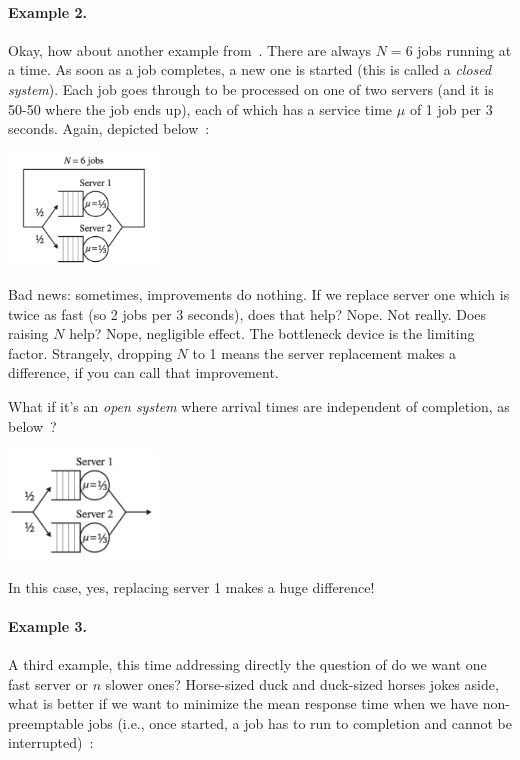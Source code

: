 \paragraph{Example 2.} Okay, how about another example from~\cite{pmd}. There are always $N=6$ jobs running at a time. As soon as a job completes, a new one is started (this is called a \textit{closed system}). Each job goes through to be processed on one of two servers (and it is 50-50 where the job ends up), each of which has a service time $\mu$ of 1 job per 3 seconds. Again, depicted below~\cite{pmd}:


\begin{center}
	\includegraphics[width=0.3\textwidth]{images/qt-example2.png}
\end{center}

Bad news: sometimes, improvements do nothing. If we replace server one which is twice as fast (so 2 jobs per 3 seconds), does that help? Nope. Not really. Does raising $N$ help? Nope, negligible effect. The bottleneck device is the limiting factor. Strangely, dropping $N$ to 1 means the server replacement makes a difference, if you can call that improvement. 

What if it's an \textit{open system} where arrival times are independent of completion, as below~\cite{pmd}?


\begin{center}
	\includegraphics[width=0.3\textwidth]{images/qt-example2-2.png}
\end{center}

In this case, yes, replacing server 1 makes a huge difference!

\paragraph{Example 3.} A third example, this time addressing directly the question of do we want one fast server or $n$ slower ones? Horse-sized duck and duck-sized horses jokes aside, what is better if we want to minimize the mean response time when we have non-preemptable jobs (i.e., once started, a job has to run to completion and cannot be interrupted)~\cite{pmd}:


